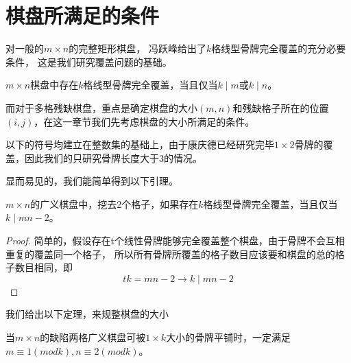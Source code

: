 \chapter{棋盘所满足的条件}

对一般的$m \times n$的完整矩形棋盘， 冯跃峰\cite{fengBasicTheorem}给出了$k$格线型骨牌完全覆盖的充分必要条件， 这是我们研究覆盖问题的基础。

\begin{lemma}
    \label{basic-lemma-1}
    $m \times n$棋盘中存在$k$格线型骨牌完全覆盖，当且仅当$k \mid m$或$k \mid n$。
\end{lemma}

而对于多格残缺棋盘，重点是确定棋盘的大小$(m, n)$和残缺格子所在的位置$(i, j)$，在这一章节我们先考虑棋盘的大小所满足的条件。

以下的符号均建立在整数集的基础上，由于康庆德已经研究完毕$1 \times 2$骨牌的覆盖\cite{ZRZZ199205013}，因此我们的只研究骨牌长度大于3的情况。

显而易见的，我们能简单得到以下引理。
\begin{lemma}
    \label{basic-lemma-2}
    $m \times n$的广义棋盘中，挖去2个格子，如果存在$k$格线型骨牌完全覆盖，当且仅当$k \mid mn - 2$。
\end{lemma}
\begin{proof}
    简单的，假设存在t个线性骨牌能够完全覆盖整个棋盘，由于骨牌不会互相重复的覆盖同一个格子，
    所以所有骨牌所覆盖的格子数目应该要和棋盘的总的格子数目相同，即
    \begin{equation}
        tk = mn - 2 \rightarrow k \mid mn - 2
    \end{equation}
\end{proof}
我们给出以下定理，来规整棋盘的大小
\begin{theorem}
    \label{basic-theorem-1}
    当$m \times n$的缺陷两格广义棋盘可被$1 \times k$大小的骨牌平铺时，一定满足$m \equiv 1 (mod k), n \equiv 2 (mod k)$。
\end{theorem}

